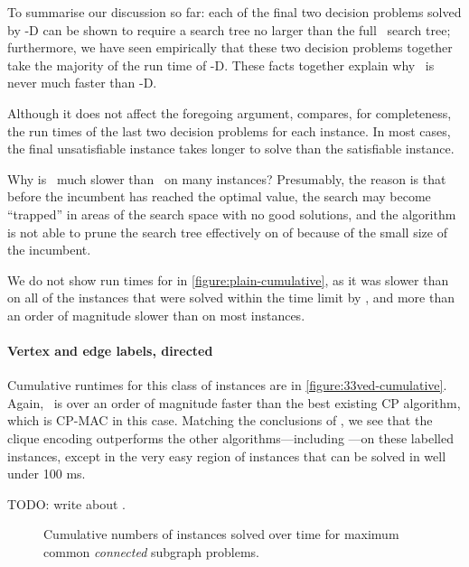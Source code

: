 To summarise our discussion so far: each of the final two decision problems solved by \McSplit-D can
be shown to require a search tree no larger than the full \McSplit\ search tree; furthermore,
we have seen empirically that these two decision problems together take the majority of
the run time of \McSplit-D.  These facts together explain why \McSplit\ is never much faster
than \McSplit-D.

Although it does not affect the foregoing argument,
 compares, for completeness, the
run times of the last two decision problems for each instance.  In most cases, the final
unsatisfiable instance takes longer to solve than the satisfiable instance.

Why is \McSplit\ much slower than \McSplitDown\ on many instances?  Presumably,
the reason is that before the incumbent has reached the optimal value,
the search may become ``trapped'' in areas of the search space with no good solutions,
and the algorithm is not able to prune the search tree effectively
on  of  because of the
small size of the incumbent.

We do not show run times for \kDown in \cref{figure:plain-cumulative},
as it was slower than \McSplitDown on all of the instances that were solved
within the time limit by \kDown, and more than an order of magnitude slower
than \McSplitDown on most instances.

\paragraph{Vertex and edge labels, directed} Cumulative runtimes for this
class of instances are in \cref{figure:33ved-cumulative}. Again, \McSplit\ is over
an order of magnitude faster than the best existing CP algorithm, which is
CP-MAC in this case. Matching the conclusions of
\citet{DBLP:conf/cp/McCreeshNPS16}, we see that the clique encoding outperforms
the other algorithms---including \McSplit---on these labelled instances, except
in the very easy region of instances that can be solved in well under 100 ms.

TODO: write about \McSplitDown.

\begin{figure}[h!]
    \centering
    \par\bigskip
    \caption{Cumulative numbers of instances solved over time for maximum
    common \emph{connected} subgraph problems.}\label{figure:mcs-cumulative-connected}
\end{figure}

